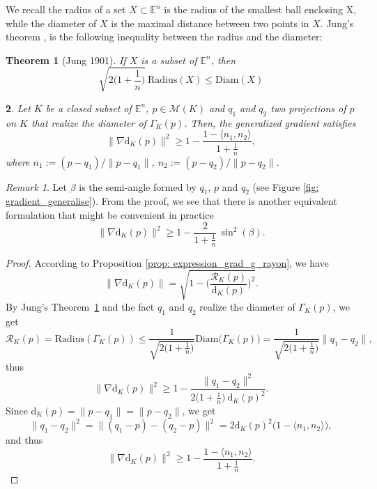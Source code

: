 \documentclass[11pt,reqno,a4paper]{article}%
\newtheorem{theorem}{Theorem}[section]
\newtheorem{lemma}[theorem]{\sc{Lemma}}
\theoremstyle{definition}
\theoremstyle{remark}
\newtheorem{remark}{Remark}[section]
\renewcommand{\leq}{\leqslant}
\renewcommand{\geq}{\geqslant}
\renewcommand{\d}{\mathrm{d}}
\newcommand{\E}{\mathbb{E}}
\renewcommand{\d}{\mathrm{d}}
\begin{document}

We recall the radius of a set $X \subset \E^n$ is the radius of the smallest ball enclosing X, while the diameter of $X$ is the maximal distance between two points in $X$.
Jung's theorem \cite{Jung1901}, is the following inequality between the radius and the diameter:

\begin{theorem}[Jung 1901] \label{theo: Jung}
    If $X$ is a subset of $\E^n$, then $$ \sqrt{2\big( 1 + \frac{1}{n}\big)} ~ \mathrm{Radius}(X) \leq \mathrm{Diam}(X)$$
\end{theorem}

\begin{lemma} \label{lem: consequnce_Jung}
    Let $K$ be a closed subset of $\E^n$, $p \in \mathscr{M}(K)$ and $q_1$ and $q_2$ two projections of $p$ on $K$ that realize the diameter of $\Gamma_K(p)$.
    Then, the generalized gradient satisfies
     $$\| \nabla \d_K(p) \|^2 \geq 1 - \frac{ 1 - \langle {n_1}, {n_2} \rangle }{1 + \frac{1}{n} },$$
    where ${n_1} :=(p-q_1)/\|p-q_1\|$, ${n_2} :=(p-q_2)/\|p-q_2\|$.
\end{lemma}
\begin{remark} Let $\beta$ is the semi-angle formed by $q_1$, $p$ and $q_2$ (see Figure \ref{fig: gradient_generalise}). From the proof, we see that there is another equivalent formulation that might be convenient in practice
    $$ \| \nabla \d_K(p) \|^2 \geq  1- \frac{2}{1 + \frac{1}{n}} \, \sin^2(\beta).$$
\end{remark}
\begin{proof}
    According to Proposition \ref{prop: expression_grad_g_rayon}, we have 
    $$\| \nabla \d_K (p) \| = \sqrt{ 1 - \bigg( \frac{\mathscr{R}_K(p)}{\d_K(p)} \bigg)^2} .$$
    By Jung's Theorem~\ref{theo: Jung} and the fact $q_1$ and $q_2$ realize the diameter of $\Gamma_K(p)$, we get
    $$ \mathscr{R}_K(p) = \mathrm{Radius}(\Gamma_K(p)) \leq \frac{1}{\sqrt{2\big( 1 + \frac{1}{n}\big)}}  \mathrm{Diam}\big( \Gamma_K(p) \big)
    = \frac{1}{\sqrt{2\big( 1 + \frac{1}{n}\big)}}\|q_1-q_2\|
    ,$$
    thus
    $$\| \nabla \d_K (p) \|^2 \geq 1 - \frac{\|q_1 - q_2\|^2}{2\big( 1 + \frac{1}{n}\big) ~ \d_K(p)^2 } .$$
        Since $\d_K(p)=\|p-q_1\|=\|p-q_2\|$, we get
    $$\|q_1 - q_2\|^2 = \|(q_1 - p) - (q_2 - p)\|^2 = 2 \d_K(p)^2 \big( 1 - \langle {n_1}, {n_2} \rangle \big),$$
and thus
$$\| \nabla \d_K (p) \|^2 \geq 1 - \frac{ 1 - \langle {n_1}, {n_2} \rangle }{1 + \frac{1}{n} }.$$
\end{proof}
\end{document}
